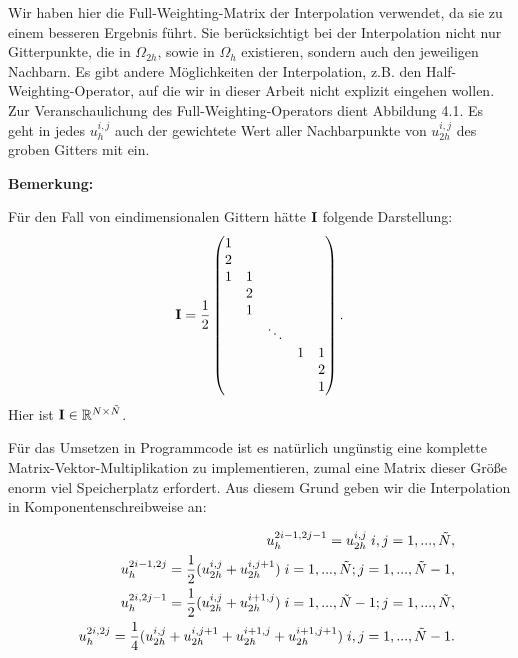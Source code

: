 Wir haben hier die Full-Weighting-Matrix der Interpolation verwendet, da sie zu einem besseren Ergebnis führt. Sie berücksichtigt bei der Interpolation nicht nur Gitterpunkte, die in $\Omega_{2h}$, sowie in $\Omega_{h}$ existieren, sondern auch den jeweiligen Nachbarn. Es gibt andere Möglichkeiten der Interpolation, z.B. den Half-Weighting-Operator, auf die wir in dieser Arbeit nicht explizit eingehen wollen. Zur Veranschaulichung des Full-Weighting-Operators dient Abbildung 4.1. Es geht in jedes $u^{i,j}_{h}$ auch der gewichtete Wert aller Nachbarpunkte von $u^{i,j}_{2h}$ des groben Gitters mit ein.

\textbf{Bemerkung:}

Für den Fall von eindimensionalen Gittern hätte ${\textbf{I}}$ folgende Darstellung:
\begin{equation}
{\textbf{I}} = \frac {1} {2}
\begin{pmatrix}
1\\
2\\
1 & 1\\
  & 2\\
  & 1\\
  &   & \ddots\\
  &   &          & 1 & 1\\
  &   &          &   & 2\\
  &   &          &   & 1
\end{pmatrix}.
\end{equation}
Hier ist ${\textbf{I}} \in \mathbb{R}^{N \times \tilde N}$.

\label{img.Prolongation}

Für das Umsetzen in Programmcode ist es natürlich ungünstig eine komplette Matrix-Vektor-Multiplikation zu implementieren, zumal eine Matrix dieser Größe enorm viel Speicherplatz erfordert. Aus diesem Grund geben wir die Interpolation in Komponentenschreibweise an:

\begin{eqnarray}
&&u_{h}^{2i-1,2j-1} = u_{2h}^{i,j} \hspace{0.1cm} i,j = 1,...,\tilde N, \\
&&u_{h}^{2i-1,2j} = \frac{1}{2} (u_{2h}^{i,j} + u_{2h}^{i,j+1}) \hspace{0.1cm} i = 1,...,\tilde N; j = 1,...,\tilde N - 1, \\
&&u_{h}^{2i,2j-1} = \frac{1}{2} (u_{2h}^{i,j} + u_{2h}^{i+1,j}) \hspace{0.1cm} i = 1,...,\tilde N - 1; j = 1,...,\tilde N, \\
&&u_{h}^{2i,2j} = \frac{1}{4} (u_{2h}^{i,j} + u_{2h}^{i,j+1} + u_{2h}^{i+1,j} + u_{2h}^{i+1,j+1}) \hspace{0.1cm} i,j = 1,...,\tilde N - 1.
\end{eqnarray}

